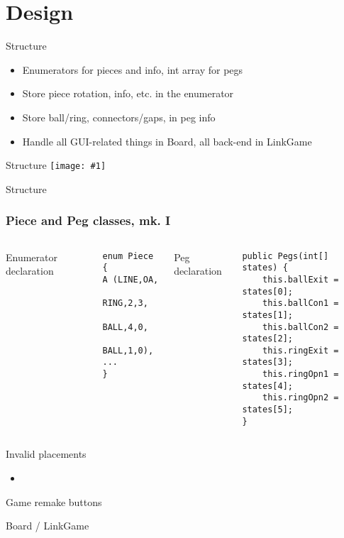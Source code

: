 \documentclass[12pt]{beamer}
\newcommand{\fitimagewidth}[1]{\texttt{[image: \#1]}}
\begin{document}
\section{Design}
\begin{frame}
\end{frame}
\begin{frame}{Structure}
	\begin{itemize}
	\item Enumerators for pieces and info, int array for pegs
	\item Store piece rotation, info, etc. in the enumerator
	\item Store ball/ring, connectors/gaps, in peg info
	\item Handle all GUI-related things in Board, all back-end in LinkGame
	\end{itemize}
\end{frame}
\begin{frame}{Structure}
	\fitimagewidth{uml.png}

\end{frame}
\begin{frame}{Structure}

\end{frame}
\begin{frame}[fragile]
	\frametitle{Piece and Peg classes, mk. I}
	\begin{columns}[T]
		Enumerator declaration
			\begin{lstlisting}
enum Piece {
A (LINE,OA,
	RING,2,3,
	BALL,4,0,
	BALL,1,0),
...
}
			\end{lstlisting}
		Peg declaration
			\begin{lstlisting}
public Pegs(int[] states) {
	this.ballExit = states[0];
	this.ballCon1 = states[1];
	this.ballCon2 = states[2];
	this.ringExit = states[3];
	this.ringOpn1 = states[4];
	this.ringOpn2 = states[5];
}
		\end{lstlisting}
	\end{columns}

\end{frame}
\begin{frame}{Invalid placements}
	\begin{itemize}
	\item
	\end{itemize}
\end{frame}
\begin{frame}{Game remake buttons}

\end{frame}
\begin{frame}{Board / LinkGame}

\end{frame}
\end{document}
